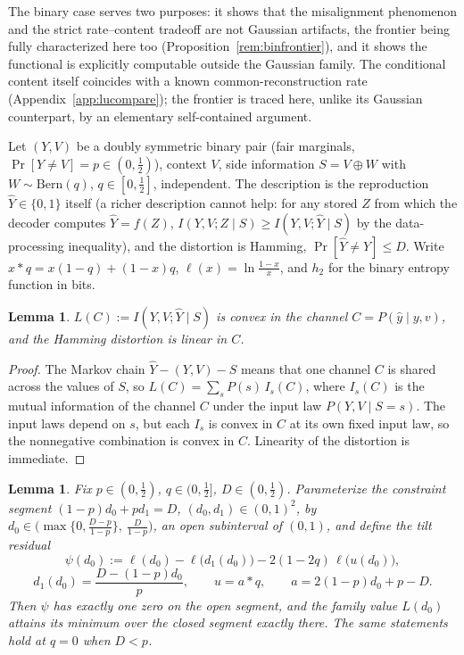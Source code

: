\documentclass[11pt,onecolumn]{IEEEtran}
\newtheorem{lemma}[theorem]{Lemma}
\newcommand{\hY}{\widehat{Y}}
\begin{document}
The binary case serves two purposes: it shows that the
misalignment phenomenon and the strict rate--content tradeoff are not
Gaussian artifacts, the frontier being fully characterized here too
(Proposition~\ref{rem:binfrontier}), and it shows the functional is
explicitly computable outside the Gaussian family. The conditional
content itself coincides with a known common-reconstruction rate
(Appendix~\ref{app:lucompare}); the frontier is traced here, unlike its
Gaussian counterpart, by an elementary self-contained argument.

Let $(Y,V)$ be a doubly symmetric binary pair (fair marginals,
$\Pr[Y\ne V]=p\in(0,\tfrac12)$), context $V$, side information
$S=V\oplus W$ with $W\sim\mathrm{Bern}(q)$, $q\in[0,\tfrac12]$,
independent. The description is the reproduction $\hY\in\{0,1\}$ itself
(a richer description cannot help: for any stored $Z$ from which the
decoder computes $\hY=f(Z)$, $I(Y,V;Z\mid S)\ge I(Y,V;\hY\mid S)$
by the data-processing inequality), and the distortion is Hamming,
$\Pr[\hY\ne Y]\le D$. Write $x*q=x(1-q)+(1-x)q$,
$\ell(x)=\ln\frac{1-x}{x}$, and $h_2$ for the binary entropy function
in bits.

\begin{lemma}\label{lem:binconvex}
$L(C):=I(Y,V;\hY\mid S)$ is convex in the channel
$C=P(\hat y\mid y,v)$, and the Hamming distortion is linear in $C$.
\end{lemma}

\begin{proof}
The Markov chain $\hY-(Y,V)-S$ means that one channel $C$ is shared
across the values of $S$, so $L(C)=\sum_sP(s)\,I_s(C)$, where $I_s(C)$
is the mutual information of the channel $C$ under the input law
$P(Y,V\mid S=s)$. The input laws depend on $s$, but each $I_s$ is
convex in $C$ at its own fixed input law, so the nonnegative
combination is convex in $C$. Linearity of the distortion is immediate.
\end{proof}

\begin{lemma}
\label{lem:tiltroot}
Fix $p\in(0,\tfrac12)$, $q\in(0,\tfrac12]$, $D\in(0,\tfrac12)$.
Parameterize the constraint segment $(1-p)d_0+pd_1=D$,
$(d_0,d_1)\in(0,1)^2$, by
$d_0\in\bigl(\max\{0,\tfrac{D-p}{1-p}\},\ \tfrac{D}{1-p}\bigr)$, an
open subinterval of $(0,1)$, and define the tilt residual
\[
\psi(d_0):=\ell(d_0)-\ell\bigl(d_1(d_0)\bigr)
-2(1-2q)\,\ell\bigl(u(d_0)\bigr),
\]
\[
d_1(d_0)=\frac{D-(1-p)d_0}{p},\qquad
u=a*q,\qquad a=2(1-p)d_0+p-D .
\]
Then $\psi$ has exactly one zero on the open segment, and the family
value $L(d_0)$ attains its minimum over the closed segment exactly
there. The same statements hold at $q=0$ when $D<p$.
\end{lemma}
\end{document}
